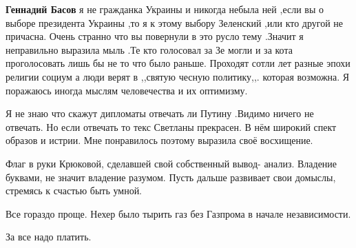 \begin{itemize}
\begin{itemize}
\textbf{Геннадий Басов} я не гражданка Украины и никогда небыла ней ,если вы о выборе
президента Украины ,то я к этому выбору Зеленский ,или кто другой не
причасна. Очень странно что вы повернули в это русло тему .Значит я неправильно
выразила мыль .Те кто голосовал за Зе могли и за кота проголосовать лишь бы не
то что было раньше. Проходят сотли лет разные эпохи религии социум а люди верят
в ,,святую чесную политику,,. которая возможна. Я поражаюсь иногда мыслям
человечества и их оптимизму.

Я не знаю что скажут дипломаты отвечать ли Путину .Видимо ничего не отвечать. Но
если отвечать то текс Светланы прекрасен. В нём широкий спект образов и
истрии. Мне понравилось поэтому выразила своё восхищение.
\end{itemize}

 

Флаг в руки Крюковой, сделавшей свой собственный вывод- анализ. Владение
буквами, не значит владение разумом. Пусть дальше развивает свои домыслы,
стремясь к счастью быть умной.


Все гораздо проще. Нехер было тырить газ без Газпрома в начале независимости.

За все надо платить.

\end{itemize}

